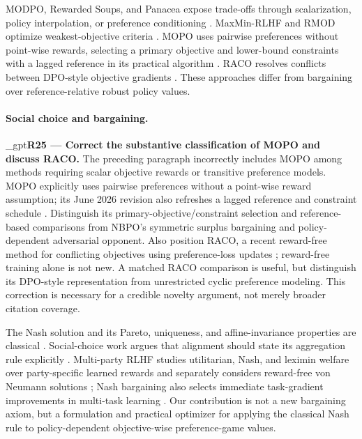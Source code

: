 \documentclass{article}
\newif\ifshowreviews
\newcommand{\reviewresponse}[1]{%
  \ifshowreviews
  \par\begingroup\color{blue!65!black}\hypersetup{allcolors=blue!65!black}\emergencystretch=2em%
  \noindent\textbf{Response:} #1\par\endgroup
  \fi}
\theoremstyle{remark}
\theoremstyle{plain}
\begin{document}
MODPO, Rewarded Soups, and Panacea expose trade-offs through scalarization, policy interpolation, or preference conditioning \citep{zhou2024beyond,rame2023rewarded,zhong2024panacea}. MaxMin-RLHF and RMOD optimize weakest-objective criteria \citep{chakraborty2024maxmin,son2026rmod}. MOPO uses pairwise preferences without point-wise rewards, selecting a primary objective and lower-bound constraints with a lagged reference in its practical algorithm \citep{agnihotri2026mopo}. RACO resolves conflicts between DPO-style objective gradients \citep{chen2026raco}. These approaches differ from bargaining over reference-relative robust policy values.

\paragraph{Social choice and bargaining.}

\kekim_gpt{\textbf{R25 --- Correct the substantive classification of MOPO and discuss RACO.} The preceding paragraph incorrectly includes MOPO among methods requiring scalar objective rewards or transitive preference models. MOPO explicitly uses pairwise preferences without a point-wise reward assumption; its June 2026 revision also refreshes a lagged reference and constraint schedule \citep{agnihotri2026mopo}. Distinguish its primary-objective/constraint selection and reference-based comparisons from NBPO's symmetric surplus bargaining and policy-dependent adversarial opponent. Also position RACO, a recent reward-free method for conflicting objectives using preference-loss updates \citep{chen2026raco}; reward-free training alone is not new. A matched RACO comparison is useful, but distinguish its DPO-style representation from unrestricted cyclic preference modeling. This correction is necessary for a credible novelty argument, not merely broader citation coverage.}
\reviewresponse{\textbf{R25 --- Addressed.} Related Work now describes MOPO as using pairwise preferences without point-wise rewards, with a primary objective, lower-bound constraints, and a lagged reference. It also positions RACO through DPO-style objective gradients, so reward-free training alone is not presented as NBPO's novelty; a matched RACO experiment is not reported.}

The Nash solution and its Pareto, uniqueness, and affine-invariance properties are classical \citep{nash1950}. Social-choice work argues that alignment should state its aggregation rule explicitly \citep{conitzer2024social}. Multi-party RLHF studies utilitarian, Nash, and leximin welfare over party-specific learned rewards and separately considers reward-free von Neumann solutions \citep{zhong2024nashwelfare}; Nash bargaining also selects immediate task-gradient improvements in multi-task learning \citep{navon2022nashmtl}. Our contribution is not a new bargaining axiom, but a formulation and practical optimizer for applying the classical Nash rule to policy-dependent objective-wise preference-game values.
\end{document}
